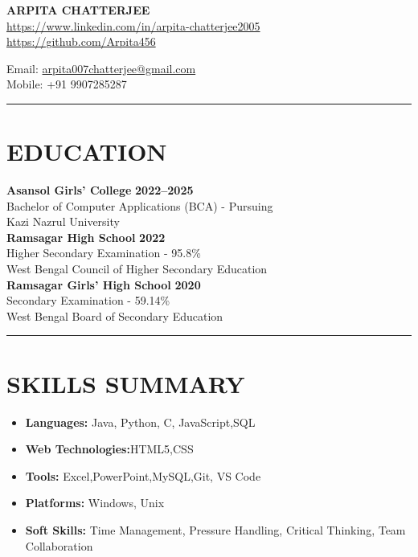 \documentclass[11pt, a4paper]{article}
\begin{document}
\noindent
\begin{minipage}{0.6\textwidth}
    {\Large\textbf{ARPITA CHATTERJEE}}\\[0.1in]\href{https://www.linkedin.com/in/arpita-chatterjee2005}{https://www.linkedin.com/in/arpita-chatterjee2005}\\\href{https://github.com/Arpita456}{https://github.com/Arpita456}
\end{minipage}
\begin{minipage}{0.4\textwidth}
    \raggedleft
    Email: \href{mailto:arpita007chatterjee@gmail.com}{arpita007chatterjee@gmail.com} \\Mobile: +91 9907285287
\end{minipage}

\noindent\rule{\textwidth}{0.4pt}

{\centering\section*{EDUCATION}\par}
\textbf{Asansol Girls' College} \hfill \textbf{2022--2025}\\
Bachelor of Computer Applications (BCA) - Pursuing\\
Kazi Nazrul University\\

\textbf{Ramsagar High School} \hfill \textbf{2022}\\
Higher Secondary Examination - 95.8\%\\
West Bengal Council of Higher Secondary Education\\

\textbf{Ramsagar Girls' High School} \hfill \textbf{2020}\\
Secondary Examination - 59.14\%\\
West Bengal Board of Secondary Education\\

\noindent\rule{\textwidth}{0.4pt}

{\centering\section*{SKILLS SUMMARY}\par}
\begin{itemize}[noitemsep,topsep=0pt]
    \item \textbf{Languages:} Java, Python, C, JavaScript,SQL
    \item \textbf{Web Technologies:}HTML5,CSS
    \item \textbf{Tools:} Excel,PowerPoint,MySQL,Git, VS Code
    \item \textbf{Platforms:} Windows, Unix
    \item \textbf{Soft Skills:} Time Management, Pressure Handling, Critical Thinking, Team Collaboration
\end{itemize}
\end{document}

